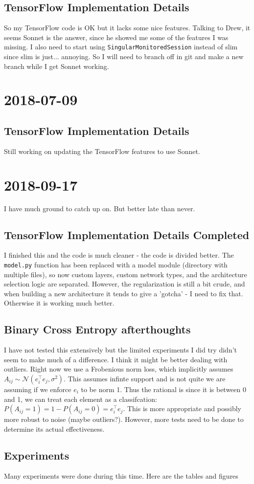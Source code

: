 \documentclass[a4paper]{article}
\newcommand{\DatestampYMD}[3]{\mbox{#1-#2-#3}}
\newcommand{\entry}[3]{\newpage\section*{\DatestampYMD{#1}{#2}{#3}} }
\begin{document}
\subsection*{TensorFlow Implementation Details}
So my TensorFlow code is OK but it lacks some nice features.
Talking to Drew, it seems Sonnet is the answer, since he showed me some of the features I was missing.
I also need to start using \texttt{SingularMonitoredSession} instead of slim since slim is just... annoying.
So I will need to branch off in git and make a new branch while I get Sonnet working.

\entry{2018}{07}{09}
\subsection*{TensorFlow Implementation Details}
Still working on updating the TensorFlow features to use Sonnet.

\entry{2018}{09}{17}
I have much ground to catch up on. But better late than never.
\subsection*{TensorFlow Implementation Details Completed}
I finished this and the code is much cleaner - the code is divided better. The \texttt{model.py} function has been replaced with a model module (directory with multiple files), so now custom layers, custom network types, and the architecture selection logic are separated. However, the regularization is still a bit crude, and when building a new architecture it tends to give a 'gotcha' - I need to fix that. Otherwise it is working much better.
\subsection*{Binary Cross Entropy afterthoughts}
I have not tested this extensively but the limited experiments I did try didn't seem to make much of a difference. I think it might be better dealing with outliers. Right now we use a Frobenious norm loss, which implicitly assumes $A_{ij} \sim \mathcal{N}(e_i^\top e_j, \sigma^2)$. This assumes infinte support and is not quite we are assuming if we enforce $e_i$ to be norm 1. Thus the rational is since it is between 0 and 1, we can treat each element as a classifcation: $P(A_{ij} = 1) = 1 - P(A_{ij} = 0) = e_i^\top e_j$. This is more appropriate and possibly more robust to noise (maybe outliers?). However, more tests need to be done to determine its actual effectiveness.
\subsection*{Experiments}
Many experiments were done during this time. Here are the tables and figures
\end{document}
